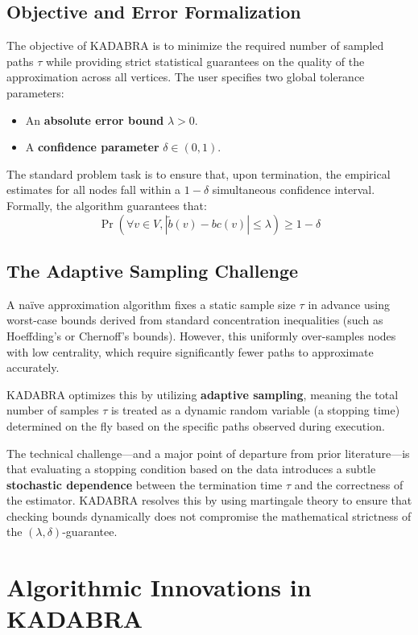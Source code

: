 \subsection{Objective and Error Formalization}
The objective of KADABRA is to minimize the required number of sampled paths $\tau$ while providing strict statistical guarantees on the quality of the approximation across all vertices. The user specifies two global tolerance parameters:
\begin{itemize}
    \item An \textbf{absolute error bound} $\lambda > 0$.
    \item A \textbf{confidence parameter} $\delta \in (0, 1)$.
\end{itemize}

The standard problem task is to ensure that, upon termination, the empirical estimates for all nodes fall within a $1-\delta$ simultaneous confidence interval. Formally, the algorithm guarantees that:
\begin{equation}
    \Pr(\forall v \in V, |\tilde{b}(v) - bc(v)| \le \lambda) \ge 1 - \delta
\end{equation}

\subsection{The Adaptive Sampling Challenge}
A na\"ive approximation algorithm fixes a static sample size $\tau$ in advance using worst-case bounds derived from standard concentration inequalities (such as Hoeffding's or Chernoff's bounds).
 However, this uniformly over-samples nodes with low centrality, which require significantly fewer paths to approximate accurately.

KADABRA optimizes this by utilizing \textbf{adaptive sampling}, meaning the total number of samples $\tau$ is treated as a dynamic random variable (a stopping time) determined on the fly based on the specific paths observed during execution.

The technical challenge—and a major point of departure from prior literature—is that evaluating a
 stopping condition based on the data introduces a subtle \textbf{stochastic dependence} between the termination time $\tau$ 
 and the correctness of the estimator. KADABRA resolves this by using martingale theory to ensure that checking bounds dynamically 
 does not compromise the mathematical strictness of the $(\lambda, \delta)$-guarantee.


 \section{Algorithmic Innovations in KADABRA}

